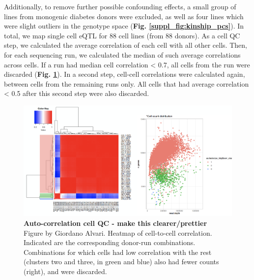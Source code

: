 
Additionally, to remove further possible confounding effects, a small group of lines from monogenic diabetes donors were excluded, as well as four lines which were slight outliers in the genotype space (\textbf{Fig. \ref{suppl_fig:kinship_pcs}}).
In total, we map single cell eQTL for 88 cell lines (from 88 donors).
As a cell QC step, we calculated the average correlation of each cell with all other cells.
Then, for each sequencing run, we calculated the median of such average correlations across cells.
If a run had median cell correlation < 0.7, all cells from the run were discarded (\textbf{Fig. \ref{fig:sc_eqtl_autocorrelation}}).
In a second step, cell-cell correlations were calculated again, between cells from the remaining runs only.
All cells that had average correlation < 0.5 after this second step were also discarded. \\

\begin{figure}[h]
\centering
\includegraphics[width=15cm]{Chapter3/Fig/auto_correlation.png}
\caption[Auto-correlation cell QC]{\textbf{Auto-correlation cell QC - make this clearer/prettier}\\
Figure by Giordano Alvari.
Heatmap of cell-to-cell correlation. 
Indicated are the corresponding donor-run combinations.
Combinations for which cells had low correlation with the rest (clusters two and three, in green and blue) also had fewer counts (right), and were discarded.}
\label{fig:sc_eqtl_autocorrelation}
\end{figure}

